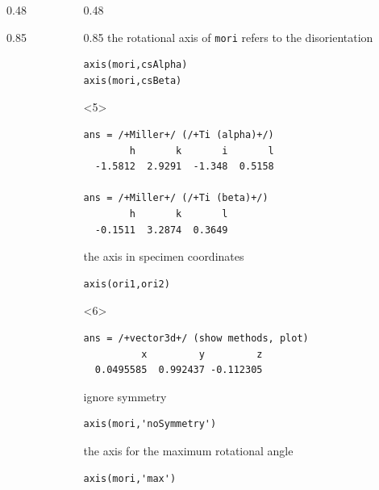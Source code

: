 \documentclass[compress,aspectratio=1610,fleqn]{beamer}
\begin{document}
\begin{frame}[fragile]
\begin{columns}
\begin{column}{0.48\textwidth}
\begin{overlayarea}{\textwidth}{0.85\textheight}
    
  \end{overlayarea}
\end{column}
\begin{column}{0.48\textwidth}
  \begin{overlayarea}{\textwidth}{0.85\textheight}
\pause
  the rotational axis of \texttt{mori} refers to the disorientation
  \vspace{-0.2cm}
\begin{lstlisting}[style=input]
axis(mori,csAlpha)
axis(mori,csBeta)
\end{lstlisting}
\vspace{-.3cm}
  \begin{onlyenv}<5>
    \begin{lstlisting}[style=output]
ans = /+Miller+/ (/+Ti (alpha)+/)      
        h       k       i       l
  -1.5812  2.9291  -1.348  0.5158

ans = /+Miller+/ (/+Ti (beta)+/)
        h       k       l
  -0.1511  3.2874  0.3649
\end{lstlisting}
\end{onlyenv}

\pause
\bigskip

the axis in specimen coordinates
\vspace{-.3cm}
\begin{lstlisting}[style=input]
axis(ori1,ori2)
\end{lstlisting}
\vspace{-.3cm}
    \begin{onlyenv}<6>
\begin{lstlisting}[style=output]
ans = /+vector3d+/ (show methods, plot)
          x         y         z
  0.0495585  0.992437 -0.112305
\end{lstlisting}
\end{onlyenv}

\pause
\bigskip

ignore symmetry
\vspace{-0.2cm}
\begin{lstlisting}[style=input]
axis(mori,'noSymmetry')
\end{lstlisting}

    \pause
    \bigskip

    the axis for the maximum rotational angle
    \vspace{-0.2cm}
    \begin{lstlisting}[style=input]
axis(mori,'max')
    \end{lstlisting}

\end{overlayarea}
\end{column}
\end{columns}
\end{frame}
\end{document}
